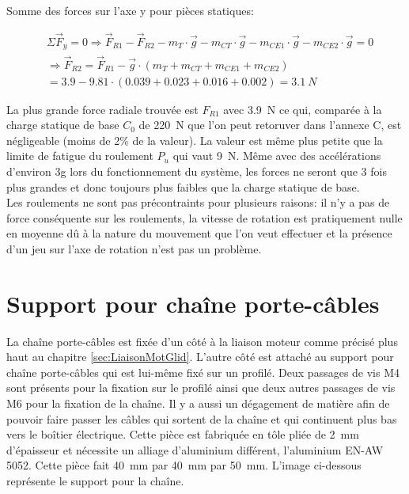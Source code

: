 Somme des forces sur l'axe y pour pièces statiques:

\begin{equation}
    \begin{aligned}
         & \Sigma \vec{F}_y = 0 \Rightarrow \vec{F}_{R1} - \vec{F}_{R2} - m_T \cdot \vec{g} - m_{CT} \cdot \vec{g} - m_{CE1} \cdot \vec{g} - m_{CE2} \cdot \vec{g} = 0 \\
         & \Rightarrow \vec{F}_{R2} = \vec{F}_{R1} - \vec{g} \cdot (m_T + m_{CT} + m_{CE1} + m_{CE2})                                                                  \\
         & = 3.9 - 9.81 \cdot (0.039 + 0.023 + 0.016 +0.002) = 3.1~N
    \end{aligned}
\end{equation}

La plus grande force radiale trouvée est $F_{R1}$ avec 3.9~N ce qui, comparée à la charge statique de base $C_0$ de 220~N que l'on peut retoruver dans
l'annexe C, est négligeable (moins de 2\% de la valeur). La valeur est même plus petite que la limite de fatigue du roulement $P_u$ qui vaut 9~N.
Même avec des accélérations d'environ 3g lors du fonctionnement du système, les forces ne seront que 3 fois plus grandes et donc toujours
plus faibles que la charge statique de base.\\

Les roulements ne sont pas précontraints pour plusieurs raisons: il n'y a pas de force conséquente sur les roulements, la vitesse de rotation
est pratiquement nulle en moyenne dû à la nature du mouvement que l'on veut effectuer et la présence d'un jeu sur l'axe de rotation n'est pas
un problème.

\section{Support pour chaîne porte-câbles}\label{sec:SupChainCable}
La chaîne porte-câbles est fixée d'un côté à la liaison moteur comme précisé plus haut au chapitre \ref{sec:LiaisonMotGlid}. L'autre côté est
attaché au support pour chaîne porte-câbles qui est lui-même fixé sur un profilé. Deux passages de vis M4 sont présents pour la fixation sur
le profilé ainsi que deux autres passages de vis M6 pour la fixation de la chaîne. Il y a aussi un dégagement de matière afin de pouvoir faire
passer les câbles qui sortent de la chaîne et qui continuent plus bas vers le boîtier électrique. Cette pièce est fabriquée en tôle pliée de
2~mm d'épaisseur et nécessite un alliage d'aluminium différent, l'aluminium EN-AW 5052. Cette pièce fait 40~mm par 40~mm par 50~mm.
L'image ci-dessous représente le support pour la chaîne.

